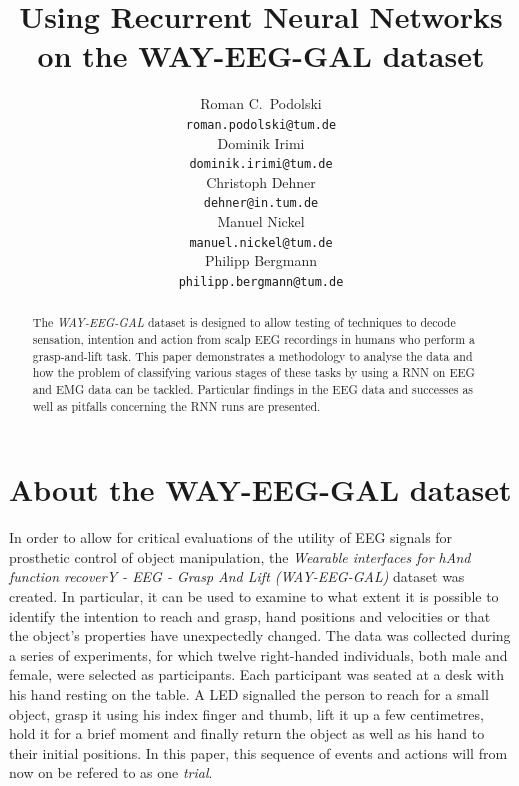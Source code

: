 \documentclass{article} %
\title{Using Recurrent Neural Networks on the WAY-EEG-GAL dataset}
\author{
Roman C.~Podolski
\\
\texttt{roman.podolski@tum.de} \\
\And
Dominik Irimi \\
\texttt{dominik.irimi@tum.de} \\
\AND
Christoph Dehner \\
\texttt{dehner@in.tum.de} \\
\And
Manuel Nickel \\
\texttt{manuel.nickel@tum.de} \\
\And
Philipp Bergmann \\
\texttt{philipp.bergmann@tum.de} \\
}
\begin{document}
\maketitle

\begin{abstract}
The \emph{WAY-EEG-GAL} dataset is designed to allow testing of techniques to decode sensation, intention and action from scalp EEG recordings in humans who perform a grasp-and-lift task.
This paper demonstrates a methodology to analyse the data and how the problem of classifying various stages of these tasks by using a RNN on EEG and EMG data can be tackled.
Particular findings in the EEG data and successes as well as pitfalls concerning the RNN runs are presented.
\end{abstract}

\section{About the WAY-EEG-GAL dataset}
\label{sec:data}
In order to allow for critical evaluations of the utility of EEG signals for prosthetic control of object manipulation, the \emph{Wearable interfaces for hAnd function recoverY - EEG - Grasp And Lift (WAY-EEG-GAL)} dataset was created. In particular, it can be used to examine to what extent it is possible to identify the intention to reach and grasp, hand positions and velocities or that the object's properties have unexpectedly changed. The data was collected during a series of experiments, for which twelve right-handed individuals, both male and female, were selected as participants. Each participant was seated at a desk with his hand resting on the table. A LED signalled the person to reach for a small object, grasp it using his index finger and thumb, lift it up a few centimetres, hold it for a brief moment and finally return the object as well as his hand to their initial positions. In this paper, this sequence of events and actions will from now on be refered to as one \emph{trial}.
\end{document}
